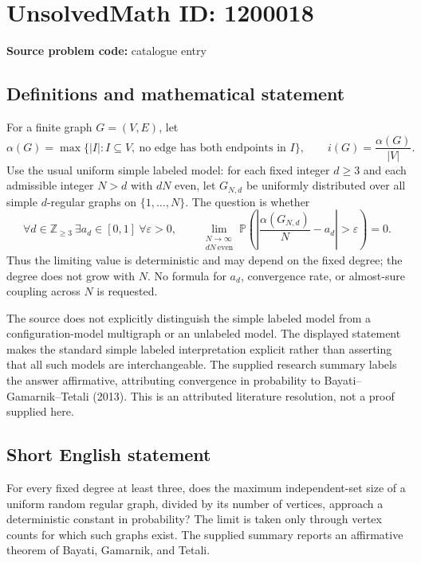 \documentclass[11pt]{article}
\newcommand{\Z}{\mathbb{Z}}
\newcommand{\PP}{\mathbb{P}}
\newcommand{\eps}{\varepsilon}
\begin{document}
\section*{UnsolvedMath ID: 1200018}
\textbf{Source problem code:} catalogue entry
\subsection{Definitions and mathematical statement}
For a finite graph $G=(V,E)$, let
\[
\alpha(G)=\max\{|I|:I\subseteq V,\ \text{no edge has both endpoints in }I\},
\qquad i(G)=\frac{\alpha(G)}{|V|}.
\]
Use the usual uniform simple labeled model: for each fixed integer $d\ge3$ and each admissible integer $N>d$ with $dN$ even, let $G_{N,d}$ be uniformly distributed over all simple $d$-regular graphs on $\{1,\ldots,N\}$. The question is whether
\[
\forall d\in\Z_{\ge3}\ \exists a_d\in[0,1]\ \forall\eps>0,
\qquad
\lim_{\substack{N\to\infty\\dN\ \mathrm{even}}}
\PP\!\left(\left|\frac{\alpha(G_{N,d})}{N}-a_d\right|>\eps\right)=0.
\]
Thus the limiting value is deterministic and may depend on the fixed degree; the degree does not grow with $N$. No formula for $a_d$, convergence rate, or almost-sure coupling across $N$ is requested.

The source does not explicitly distinguish the simple labeled model from a configuration-model multigraph or an unlabeled model. The displayed statement makes the standard simple labeled interpretation explicit rather than asserting that all such models are interchangeable. The supplied research summary labels the answer affirmative, attributing convergence in probability to Bayati--Gamarnik--Tetali (2013). This is an attributed literature resolution, not a proof supplied here.
\subsection{Short English statement}
For every fixed degree at least three, does the maximum independent-set size of a uniform random regular graph, divided by its number of vertices, approach a deterministic constant in probability? The limit is taken only through vertex counts for which such graphs exist. The supplied summary reports an affirmative theorem of Bayati, Gamarnik, and Tetali.
\end{document}

